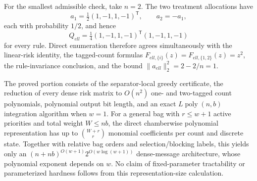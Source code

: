 For the smallest admissible check, take \(n=2\).  The two treatment allocations have
\[
 a_1=\tfrac12(1,-1,1,-1)^{\mathsf T},
 \qquad a_2=-a_1,
\]
each with probability \(1/2\), and hence
\[
 Q_{ell}=\tfrac14(1,-1,1,-1)^{\mathsf T}(1,-1,1,-1)
\]
for every rule.  Direct enumeration therefore agrees simultaneously with the linear-risk identity, the tagged-count formulas \(F_{ell,\{i\}}(z)=F_{ell,\{1,2\}}(z)=z^2\), the rule-invariance conclusion, and the bound \(\|a_{ell}\|_2^2=2-2/n=1\).

The proved portion consists of the separator-local greedy certificate, the reduction of every dense risk matrix to \(O(n^2)\) one- and two-tagged count polynomials, polynomial output bit length, and an exact \(L\operatorname{poly}(n,b)\) integration algorithm when \(w=1\).  For a general bag with \(r\le w+1\) active priorities and total weight \(W\le nb\), the direct chamberwise polynomial representation has up to \(\binom{W+r}{r}\) monomial coefficients per count and discrete state.  Together with relative bag orders and selection/blocking labels, this yields only an \((n+nb)^{O(w+1)}2^{O(w\log(w+1))}\) dense-message architecture, whose polynomial exponent depends on \(w\).  No claim of fixed-parameter tractability or parameterized hardness follows from this representation-size calculation.
